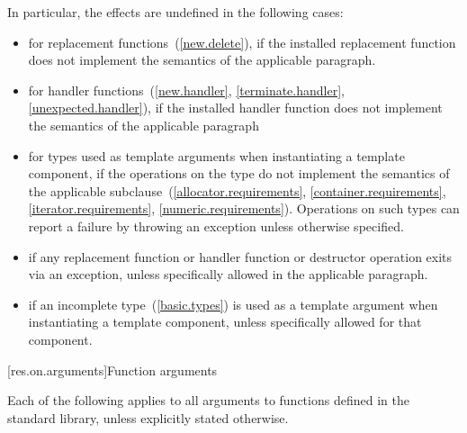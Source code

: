 \pnum
In particular, the effects are undefined in the following cases:

\begin{itemize}
\item
for replacement functions~(\ref{new.delete}), if the installed replacement function does not
implement the semantics of the applicable
\required
paragraph.
\item
for handler functions~(\ref{new.handler}, \ref{terminate.handler}, \ref{unexpected.handler}),
if the installed handler function does not implement the semantics of the applicable
\required
paragraph
\item
for types used as template arguments when instantiating a template component,
if the operations on the type do not implement the semantics of the applicable
subclause~(\ref{allocator.requirements}, \ref{container.requirements}, \ref{iterator.requirements},
\ref{numeric.requirements}).
Operations on such types can report a failure by throwing an exception
unless otherwise specified.
\item
if any replacement function or handler function or destructor operation exits via an exception,
unless specifically allowed
in the applicable
\required
paragraph.
\item
if an incomplete type~(\ref{basic.types}) is used as a template
argument when instantiating a template component, unless specifically
allowed for that component.
\end{itemize}

[res.on.arguments]{Function arguments}

\pnum
{}%
%
Each of the following applies to all arguments
%
to functions defined in the \Cpp standard library,%
unless explicitly stated otherwise.

